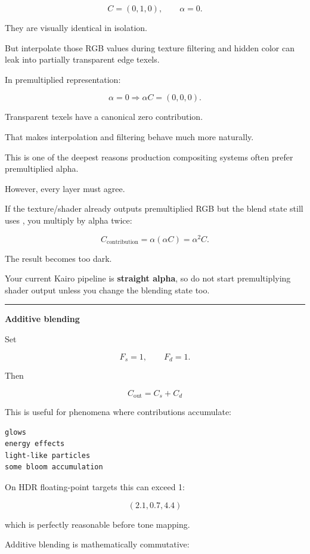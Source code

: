 \[
C=(0,1,0),\qquad \alpha=0.
\]

They are visually identical in isolation.

But interpolate those RGB values during texture filtering and hidden color can leak into partially transparent edge texels.

In premultiplied representation:

\[
\alpha=0
\Rightarrow
\alpha C=(0,0,0).
\]

Transparent texels have a canonical zero contribution.

That makes interpolation and filtering behave much more naturally.

This is one of the deepest reasons production compositing systems often prefer premultiplied alpha.

However, every layer must agree.

If the texture/shader already outputs premultiplied RGB but the blend state still uses , you multiply by alpha twice:

\[
C_{\text{contribution}}
=
\alpha(\alpha C)
=
\alpha^2C.
\]

The result becomes too dark.

Your current Kairo pipeline is \textbf{straight alpha}, so do not start premultiplying shader output unless you change the blending state too.

\begin{center}\rule{0.5\linewidth}{0.5pt}\end{center}

\textbf{Additive blending}

Set

\[
F_s=1,\qquad F_d=1.
\]

Then

\[
\boxed{
C_{\text{out}}=C_s+C_d
}
\]

This is useful for phenomena where contributions accumulate:

\begin{verbatim}
glows
energy effects
light-like particles
some bloom accumulation
\end{verbatim}

On HDR floating-point targets this can exceed 1:

\[
(2.1,0.7,4.4)
\]

which is perfectly reasonable before tone mapping.

Additive blending is mathematically commutative:

